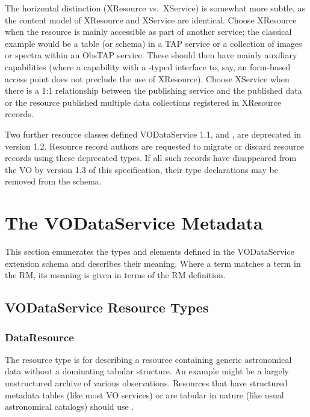\documentclass[11pt,a4paper]{ivoa}
\begin{document}
The horizontal distinction (XResource vs.~XService) is somewhat more
subtle, as the content model of XResource and XService are identical.
Choose XResource when the resource is mainly accessible as part of
another service; the classical example would be a table (or schema) in a
TAP service or a collection of images or spectra within an ObsTAP
service.  These should then have mainly auxiliary capabilities (where
a capability with a -typed interface to, say, an
form-based access point does not preclude the use of XResource).  
Choose XService when
there is a 1:1 relationship between the publishing service and the
published data or the resource published multiple data collections
registered in XResource records.


Two further resource classes defined VODataService 1.1,
 and , 
are deprecated in version 1.2.  
Resource record authors are requested to migrate or discard resource
records using these deprecated types.  If all such records have
disappeared from the VO by version 1.3 of this specification, their
type declarations may be removed from the schema.


\section{The VODataService Metadata}
\label{sect:metadata}


This section enumerates the types and elements defined in the
VODataService extension schema and describes their meaning.  Where a
term matches a term in the RM, its meaning is given
in terms of the RM definition.  


\subsection{VODataService Resource Types}
\label{sect:resext}

\subsubsection{DataResource}
\label{sect:DataResource}

The  resource type is for describing a
resource containing generic astronomical data without a dominating
tabular structure.  An example might be a largely unstructured archive
of various observations.  Resources that have structured metadata tables
(like most VO services) or are tabular in nature (like usual
astronomical catalogs) should use .
\end{document}
